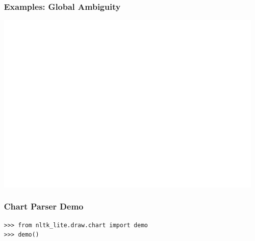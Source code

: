 \begin{frame}[fragile]
 \frametitle{Examples: Global Ambiguity}

\includegraphics[scale=.6]{../images/oldmen2.pdf}


\end{frame}




    






\begin{frame}[fragile]
  \frametitle{Chart Parser Demo}

\begin{verbatim}
>>> from nltk_lite.draw.chart import demo
>>> demo()
\end{verbatim}


\end{frame}



